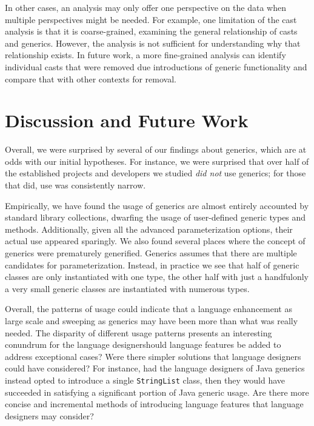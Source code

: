 \documentclass{svjour3}
\newcommand{\code}[1]{\texttt{#1}}
\begin{document}
In other cases, an analysis may only offer one perspective on the data when multiple 
perspectives might be needed.  For example, one limitation of the cast analysis is that it is coarse-grained, 
examining the general relationship of casts and generics.  However, the analysis is not sufficient for 
understanding why that relationship exists. In future work, a more fine-grained analysis can identify individual casts that were removed
due introductions of generic functionality and compare that with other contexts for removal.


\section{Discussion and Future Work}\label{sec:discussion}

Overall, we were surprised by several of our findings about generics,
which are at odds with our initial hypotheses.
For instance, we were surprised that over half of the established projects and developers we studied 
\emph{did not} use generics; for those that did, use was consistently narrow.

Empirically, we have found the usage of generics are almost entirely accounted by standard library 
collections, dwarfing the usage of user-defined generic types and methods.  Additionally, 
given all the advanced parameterization options, their actual use appeared sparingly.
We also found several places where the concept of generics were prematurely generified.
Generics assumes that there are multiple candidates for parameterization.
Instead, in practice we see that half of generic classes are only instantiated with one type, the other half with just a handful\textemdash only a very small generic classes are instantiated with numerous types.

Overall, the patterns of usage could indicate that a language enhancement 
as large scale and sweeping as generics may have been more than
what was really needed.  The disparity of different usage patterns presents an interesting conundrum for the language designer\textemdash should language features be added to address exceptional cases?  Were there simpler solutions that language designers could have considered? 
For instance, had the language designers of Java generics instead opted to introduce 
a single \code{StringList} class, then they would have succeeded in satisfying 
a significant portion of Java generic usage. Are there more concise and incremental methods of introducing language features that language designers may consider?
\end{document}

